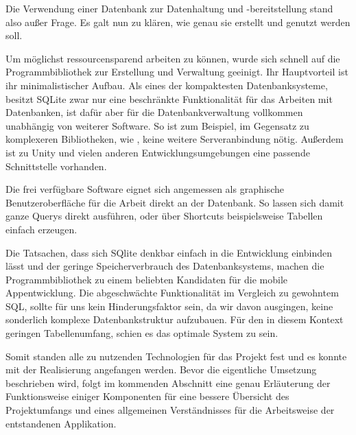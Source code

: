 Die Verwendung einer Datenbank zur Datenhaltung und -bereitstellung stand also außer Frage. Es galt nun zu klären, wie genau sie erstellt und genutzt werden soll.

Um möglichst ressourcensparend arbeiten zu können, wurde sich schnell auf die Programmbibliothek  zur Erstellung und Verwaltung geeinigt. Ihr Hauptvorteil ist ihr minimalistischer Aufbau. Als eines der kompaktesten Datenbanksysteme, besitzt SQLite zwar nur eine beschränkte Funktionalität für das Arbeiten mit Datenbanken, ist dafür aber für die Datenbankverwaltung vollkommen unabhängig von weiterer Software. So ist zum Beispiel, im Gegensatz zu komplexeren Bibliotheken, wie , keine weitere Serveranbindung nötig. Außerdem ist zu Unity und vielen anderen Entwicklungsumgebungen eine passende Schnittstelle vorhanden.

Die frei verfügbare Software  eignet sich angemessen als graphische Benutzeroberfläche für die Arbeit direkt an der Datenbank. So lassen sich damit ganze Querys direkt ausführen, oder über Shortcuts beispielsweise Tabellen einfach erzeugen.

Die Tatsachen, dass sich SQlite denkbar einfach in die Entwicklung einbinden lässt und der geringe Speicherverbrauch des Datenbanksystems, machen die Programmbibliothek zu einem beliebten Kandidaten für die mobile Appentwicklung. Die abgeschwächte Funktionalität im Vergleich zu gewohntem SQL, sollte für uns kein Hinderungsfaktor sein, da wir davon ausgingen, keine sonderlich komplexe Datenbankstruktur aufzubauen. Für den in diesem Kontext geringen Tabellenumfang, schien es das optimale System zu sein. 

Somit standen alle zu nutzenden Technologien für das Projekt fest und es konnte mit der Realisierung angefangen werden. Bevor die eigentliche Umsetzung beschrieben wird, folgt im kommenden Abschnitt eine genau Erläuterung der Funktionsweise einiger Komponenten für eine bessere Übersicht des Projektumfangs und eines allgemeinen Verständnisses für die Arbeitsweise der entstandenen Applikation.